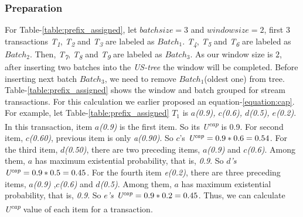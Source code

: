 \documentclass[conference]{IEEEtran}
\begin{document}
\subsubsection{Preparation}
%
For Table-\ref{table:prefix_assigned}, let $batch size=3$ and $window size=2$, first \emph{$3$} transactions \emph{T\textsubscript{1}}, \emph{T\textsubscript{2}} and \emph{T\textsubscript{3}} are labeled as $Batch_{1}$. \emph{T\textsubscript{4}}, \emph{T\textsubscript{5}} and \emph{T\textsubscript{6}} are labeled as $Batch_{2}$. Then, \emph{T\textsubscript{7}}, \emph{T\textsubscript{8}} and \emph{T\textsubscript{9}} are labeled as $Batch_{3}$. As our window size is $2$, after inserting two batches into the \emph{US-tree} the window will be completed. Before inserting next batch $Batch_{3}$, we need to remove $Batch_{1}$(oldest one) from tree. Table-\ref{table:prefix_assigned} shows the window and batch grouped for stream transactions.
For this calculation we earlier proposed an equation-\ref{equation:cap}. For example, let Table-\ref{table:prefix_assigned} $T_{1}$ is \emph{$a$(0.9), $c$(0.6), $d$(0.5), $e$(0.2)}. In this transaction, item \emph{$a$(0.9)} is the first item. So its \emph{U\textsuperscript{cap}} is 0.9. For second item, \emph{$c$(0.60)}, previous item is only \emph{a(0.90)}. So $c$'s $\emph{U\textsuperscript{cap}} = 0.9*0.6 = 0.54$.
For the third item, \emph{$d$(0.50)}, there are two preceding items, \emph{$a$(0.9)} and \emph{$c$(0.6)}. Among them, \emph{$a$} has maximum existential probability, that is, \emph{0.9}. So \emph{$d$'s} $\emph{U\textsuperscript{cap}} = 0.9*0.5 = 0.45$. For the fourth item \emph{e(0.2)}, there are three preceding items, \emph{$a$(0.9)} ,\emph{$c$(0.6)} and \emph{$d$(0.5)}. Among them, \emph{$a$} has maximum existential probability, that is, \emph{0.9}. So \emph{$e$'s} $\emph{U\textsuperscript{cap}} = 0.9*0.2 = 0.45$. Thus, we can calculate \emph{U\textsuperscript{cap}} value of each item for a transaction.
\end{document}
